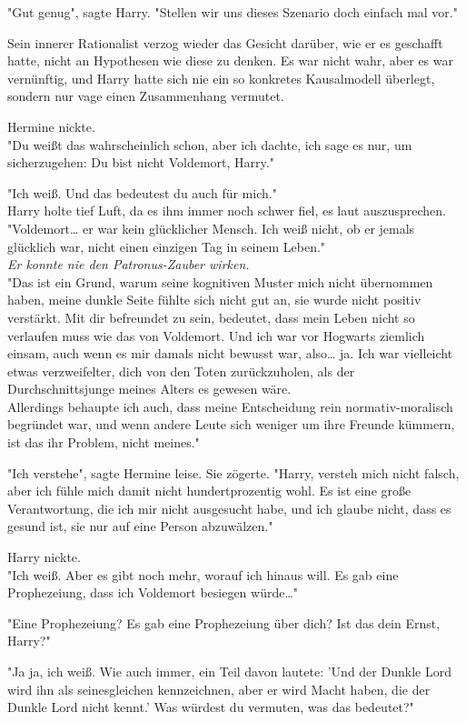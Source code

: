 {"Gut genug", sagte Harry. "Stellen wir uns dieses Szenario doch einfach mal vor."

Sein innerer Rationalist verzog wieder das Gesicht darüber, wie er es geschafft hatte, nicht an Hypothesen wie diese zu denken. Es war nicht wahr, aber es war vernünftig, und Harry hatte sich nie ein so konkretes Kausalmodell überlegt, sondern nur vage einen Zusammenhang vermutet.

Hermine nickte.\\ "Du weißt das wahrscheinlich schon, aber ich dachte, ich sage es nur, um sicherzugehen: Du bist nicht Voldemort, Harry."

"Ich weiß. Und das bedeutest du auch für mich."\\ Harry holte tief Luft, da es ihm immer noch schwer fiel, es laut auszusprechen.\\ "Voldemort… er war kein glücklicher Mensch. Ich weiß nicht, ob er jemals glücklich war, nicht einen einzigen Tag in seinem Leben."\\ \emph{Er konnte nie den Patronus-Zauber wirken.}\\ "Das ist ein Grund, warum seine kognitiven Muster mich nicht übernommen haben, meine dunkle Seite fühlte sich nicht gut an, sie wurde nicht positiv verstärkt. Mit dir befreundet zu sein, bedeutet, dass mein Leben nicht so verlaufen muss wie das von Voldemort. Und ich war vor Hogwarts ziemlich einsam, auch wenn es mir damals nicht bewusst war, also… ja. Ich war vielleicht etwas verzweifelter, dich von den Toten zurückzuholen, als der Durchschnittsjunge meines Alters es gewesen wäre.\\ Allerdings behaupte ich auch, dass meine Entscheidung rein normativ-moralisch begründet war, und wenn andere Leute sich weniger um ihre Freunde kümmern, ist das ihr Problem, nicht meines."

"Ich verstehe", sagte Hermine leise. Sie zögerte. "Harry, versteh mich nicht falsch, aber ich fühle mich damit nicht hundertprozentig wohl. Es ist eine große Verantwortung, die ich mir nicht ausgesucht habe, und ich glaube nicht, dass es gesund ist, sie nur auf eine Person abzuwälzen."

Harry nickte.\\ "Ich weiß. Aber es gibt noch mehr, worauf ich hinaus will. Es gab eine Prophezeiung, dass ich Voldemort besiegen würde…"

"Eine Prophezeiung? Es gab eine Prophezeiung über dich? Ist das dein Ernst, Harry?"

"Ja ja, ich weiß. Wie auch immer, ein Teil davon lautete: 'Und der Dunkle Lord wird ihn als seinesgleichen kennzeichnen, aber er wird Macht haben, die der Dunkle Lord nicht kennt.' Was würdest du vermuten, was das bedeutet?"

}
